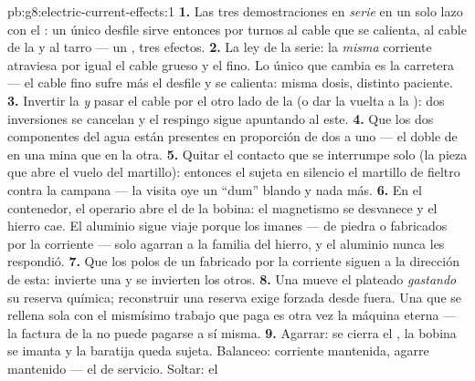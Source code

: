\begin{solution}{pb:g8:electric-current-effects:1}
\textbf{1.} Las tres demostraciones en \emph{serie} en un solo lazo
con el : un único desfile sirve entonces por turnos al
cable que se calienta, al cable de la  y al tarro --- un
, tres efectos.
\textbf{2.} La ley de la serie: la \emph{misma} corriente atraviesa
por igual el cable grueso y el fino. Lo único que cambia es la
carretera --- el cable fino sufre más el desfile y se calienta: misma
dosis, distinto paciente.
\textbf{3.} Invertir la  \emph{y} pasar el cable por el otro
lado de la  (o dar la vuelta a la ): dos
inversiones se cancelan y el respingo sigue apuntando al este.
\textbf{4.} Que los dos componentes del agua están presentes en
proporción de dos a uno --- el doble de  en una mina que en la
otra.
\textbf{5.} Quitar el contacto que se interrumpe solo (la pieza que
abre el vuelo del martillo): entonces el  sujeta en
silencio el martillo de fieltro contra la campana --- la visita oye un
``dum'' blando y nada más.
\textbf{6.} En el contenedor, el operario abre el
 de la bobina: el magnetismo se desvanece y el hierro
cae. El aluminio sigue viaje porque los imanes --- de piedra o
fabricados por la corriente --- solo agarran a la familia del hierro, y
el aluminio nunca les respondió.
\textbf{7.} Que los polos de un  fabricado por la corriente
siguen a la dirección de esta: invierte una y se invierten los otros.
\textbf{8.} Una  mueve el plateado \emph{gastando} su reserva
química; reconstruir una reserva exige  forzada desde fuera.
Una  que se rellena sola con el mismísimo trabajo que paga es
otra vez la máquina eterna --- la factura de la  no puede
pagarse a sí misma.
\textbf{9.} Agarrar: se cierra el , la bobina se imanta
y la baratija queda sujeta. Balanceo: corriente mantenida, agarre
mantenido --- el  de servicio. Soltar: el

\end{solution}
